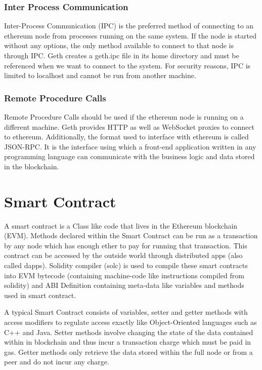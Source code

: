 \documentclass[11pt,openright]{report}
\begin{document}
\subsubsection{Inter Process Communication}
Inter-Process Communication (IPC) is the preferred method of connecting to an ethereum node from processes running on the same system. If the node is started without any options, the only method available to connect to that node is through IPC. Geth creates a geth.ipc file in its home directory and must be referenced when we want to connect to the system. For security reasons, IPC is limited to localhost and cannot be run from another machine.

\subsubsection{Remote Procedure Calls}
Remote Procedure Calls should be used if the ethereum node is running on a different machine. Geth provides HTTP as well as WebSocket proxies to connect to ethereum. Additionally, the format used to interface with ethereum is called JSON-RPC. It is the interface using which a front-end application written in any programming language can communicate with the business logic and data stored in the blockchain.

\section{Smart Contract}
A smart contract is a Class like code that lives in the Ethereum blockchain (EVM). Methods declared within the Smart Contract can be run as a transaction by any node which has enough ether to pay for running that transaction. This contract can be accessed by the outside world through distributed apps (also called dapps). Solidity compiler (solc) is used to compile these smart contracts into EVM bytecode (containing machine-code like instructions compiled from solidity) and ABI Definition containing meta-data like variables and methods used in smart contract.

A typical Smart Contract consists of variables, setter and getter methods with access modifiers to regulate access exactly like Object-Oriented languages such as C++ and Java. Setter methods involve changing the state of the data contained within in blockchain and thus incur a transaction charge which must be paid in gas. Getter methods only retrieve the data stored within the full node or from a peer and do not incur any charge.
\end{document}
